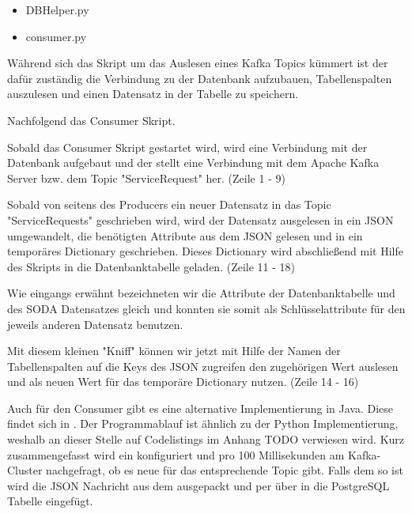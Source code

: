 \begin{itemize}
  \item DBHelper.py
  \item consumer.py
\end{itemize}

Während sich das  Skript um das Auslesen eines Kafka Topics kümmert ist der 
dafür zuständig die Verbindung zu der Datenbank aufzubauen, Tabellenspalten auszulesen und einen Datensatz in der Tabelle zu speichern.

Nachfolgend das Consumer Skript.



Sobald das Consumer Skript gestartet wird, wird eine Verbindung mit der Datenbank
aufgebaut und der  stellt eine Verbindung mit dem Apache Kafka
Server bzw. dem Topic "ServiceRequest" her.
(Zeile 1 - 9)

Sobald von seitens des Producers ein neuer Datensatz in das Topic "ServiceRequests" geschrieben wird,
wird der Datensatz ausgelesen in ein \ac{JSON} umgewandelt, die benötigten Attribute aus dem \ac{JSON} gelesen
und in ein temporäres Dictionary geschrieben.
Dieses Dictionary wird abschließend mit Hilfe des  Skripts in die
Datenbanktabelle geladen.
(Zeile 11 - 18)

Wie eingangs erwähnt bezeichneten wir die Attribute der Datenbanktabelle und des \ac{SODA} Datensatzes gleich
und konnten sie somit als Schlüsselattribute für den jeweils anderen Datensatz benutzen.

Mit diesem kleinen "Kniff" können wir jetzt mit Hilfe der Namen der Tabellenspalten
auf die Keys des \ac{JSON} zugreifen den zugehörigen Wert auslesen und als neuen Wert für das temporäre Dictionary nutzen.
(Zeile 14 - 16)

Auch für den Consumer gibt es eine alternative Implementierung in Java. Diese findet sich in .
Der Programmablauf ist ähnlich zu der Python Implementierung, weshalb an dieser Stelle auf Codelistings im Anhang TODO verwiesen wird.
Kurz zusammengefasst wird ein  konfiguriert und pro 100 Millisekunden am Kafka-Cluster nachgefragt, ob es neue  für das entsprechende Topic gibt.
Falls dem so ist wird die \ac{JSON} Nachricht aus dem  ausgepackt und per  über  in die PostgreSQL Tabelle eingefügt.
